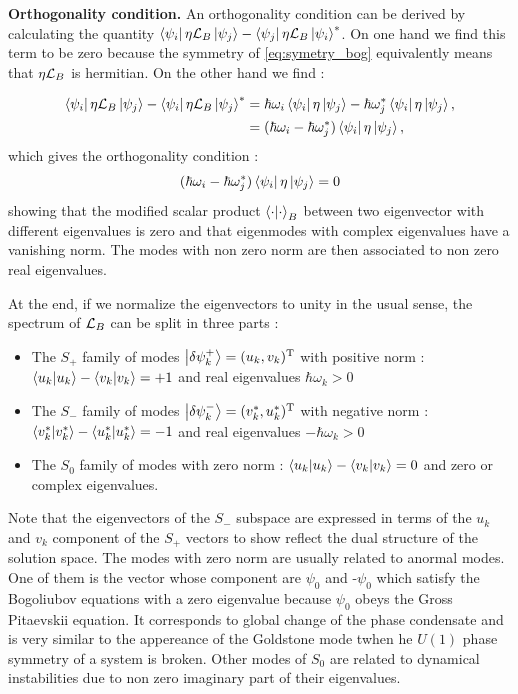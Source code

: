\textbf{Orthogonality condition.} An orthogonality condition can be derived by calculating the quantity $\bra{\psi_i}\eta\mathcal{L}_B\ket{\psi_j}-\bra{\psi_j}\eta\mathcal{L}_B\ket{\psi_i}^*$. On one hand we find this term to be zero because 
the symmetry of \autoref{eq:symetry_bog} equivalently means that $\eta\mathcal{L}_B$ is hermitian. On the other hand we find :

\begin{equation}
    \begin{align}
    \bra{\psi_i}\eta\mathcal{L}_B\ket{\psi_j}-\bra{\psi_i}\eta\mathcal{L}_B\ket{\psi_j}^*&=\hbar\omega_i\bra{\psi_i}\eta\ket{\psi_j}-\hbar\omega_j^*\bra{\psi_i}\eta\ket{\psi_j}, \\
    &=(\hbar\omega_i-\hbar\omega_j^*)\bra{\psi_i}\eta\ket{\psi_j},
    \end{align}
\end{equation}
which gives the orthogonality condition :
\begin{equation}
    (\hbar\omega_i-\hbar\omega_j^*)\bra{\psi_i}\eta\ket{\psi_j}=0
\end{equation}
showing that the modified scalar product $\bra{\cdot}\ket{\cdot}_B$ between two eigenvector with different eigenvalues is zero and that 
eigenmodes with complex eigenvalues have a vanishing norm. The modes with non zero norm are then associated to non zero real eigenvalues.


At the end, if we normalize the eigenvectors to unity in the usual sense, the spectrum of $\mathcal{L}_B$ can be split in three parts :

\begin{itemize}
    \item The $S_+$ family of modes $\ket{\delta\psi^+_k}=(u_k,v_k)^\mathrm{T}$ with positive norm : $\bra{u_k}\ket{u_k} - \bra{v_k}\ket{v_k}=+1$ and real eigenvalues $\hbar\omega_k>0$
    \item The $S_-$ family of modes $\ket{\delta\psi^-_k}=(v^*_k,u^*_k)^\mathrm{T}$ with negative norm : $\bra{v^*_k}\ket{v^*_k} - \bra{u^*_k}\ket{u^*_k}=-1$ and real eigenvalues $-\hbar\omega_k>0$
    \item The $S_0$ family of modes with zero norm : $\bra{u_k}\ket{u_k} - \bra{v_k}\ket{v_k}=0$ and zero or complex eigenvalues.
\end{itemize}
Note that the eigenvectors of the $S_-$ subspace are expressed in terms of the $u_k$ and $v_k$ component of the $S_+$ vectors to show reflect the dual structure of the solution space. The modes with zero norm are usually related to anormal modes. One of them is the vector whose component are $\psi_0$ and -$\psi_0$ which satisfy the Bogoliubov equations with a zero eigenvalue because 
$\psi_0$ obeys the Gross Pitaevskii equation. It corresponds to global change of the phase condensate and is very similar to the appereance of the Goldstone mode twhen he $U(1)$ phase symmetry of a system is broken. Other modes of $S_0$ are related to dynamical instabilities 
due to non zero imaginary part of their eigenvalues.

